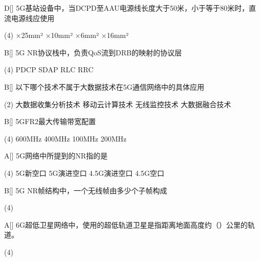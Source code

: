 \begin{choice}{D}[]
    5G基站设备中，当DCPD至AAU电源线长度大于50米，小于等于80米时，直流电源线应使用
    \begin{tasks}(4)
        ×25mm²
        ×10mm²
        ×6mm²
        ×16mm²
    \end{tasks}
\end{choice}


\begin{choice}{B}[]
    5G NR协议栈中，负责QoS流到DRB的映射的协议层
    \begin{tasks}(4)
        \task PDCP
        \task SDAP
        \task RLC
        \task RRC
    \end{tasks}
\end{choice}


\begin{choice}{B}[]
    以下哪个技术不属于大数据技术在5G通信网络中的具体应用
    \begin{tasks}(2)
        \task 大数据收集分析技术
        \task 移动云计算技术
        \task 无线监控技术
        \task 大数据融合技术
    \end{tasks}
\end{choice}


\begin{choice}{B}[]
    5GFR2最大传输带宽配置
    \begin{tasks}(4)
        \task 600MHz
        \task 400MHz
        \task 100MHz
        \task 200MHz
    \end{tasks}
\end{choice}

\begin{choice}{A}[]
    5G网络中所提到的NR指的是
    \begin{tasks}(4)
        \task 5G新空口
        \task 5G演进空口
        \task 4.5G演进空口
        \task 4.5G空口
    \end{tasks}
\end{choice}

\begin{choice}{B}[]
    5G NR帧结构中，一个无线帧由多少个子帧构成
    \begin{tasks}(4)
    \end{tasks}
\end{choice}



\begin{choice}{A}[]
    6G超低卫星网络中，使用的超低轨道卫星是指距离地面高度约（）公里的轨道。
    \begin{tasks}(4)
    \end{tasks}
\end{choice}

